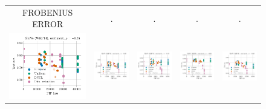 \begin{figure}
\begin{tabular}{@{\hskip -0.0in}c@{\hskip -0.0in}c@{\hskip -0.0in}c@{\hskip -0.0in}c@{\hskip -0.0in}c@{\hskip -0.0in}}
		
		FROBENIUS ERROR & . & . & . & .\\
		\includegraphics[width=.2\linewidth]{figures/glove400k_sentiment_mr_test-acc_vs_gram-large-dim-frob-error_linx.pdf} &
		\includegraphics[width=.2\linewidth]{figures/glove400k_sentiment_subj_test-acc_vs_gram-large-dim-frob-error_linx.pdf} &
		\includegraphics[width=.2\linewidth]{figures/glove400k_sentiment_cr_test-acc_vs_gram-large-dim-frob-error_linx.pdf} &
		\includegraphics[width=.2\linewidth]{figures/glove400k_sentiment_sst_test-acc_vs_gram-large-dim-frob-error_linx.pdf} &
		\includegraphics[width=.2\linewidth]{figures/glove400k_sentiment_mpqa_test-acc_vs_gram-large-dim-frob-error_linx.pdf} \\
		

\end{tabular}
\end{figure}
